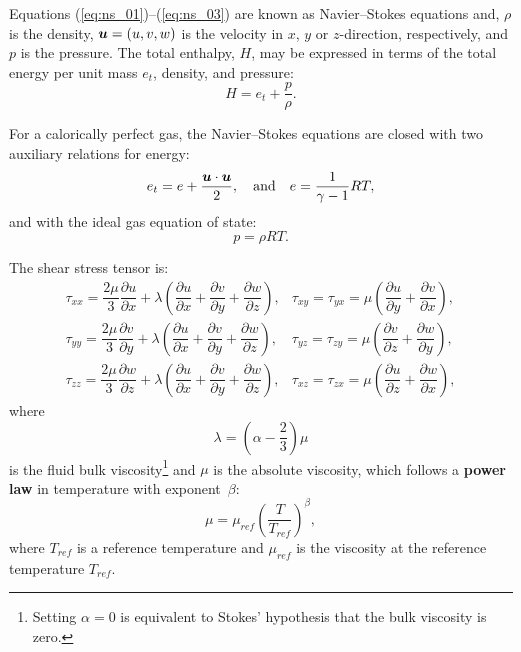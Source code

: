 \documentclass[10pt]{article}
\newcommand{\diff}[2] {\dfrac{\partial #1}{\partial #2}}
\newcommand{\bv}[1]{\ensuremath{\mbox{\boldmath$ #1 $}}}
\begin{document}
Equations (\ref{eq:ns_01})--(\ref{eq:ns_03}) are known as Navier--Stokes equations and, $\rho$ is the density, $\bv{u}=(u,v,w)$ is the velocity in $x$, $y$ or $z$-direction, respectively,    and $p$ is the pressure. The total enthalpy, $H$, may be expressed in terms of the total energy per unit mass $e_t$, density, and pressure:
$$H = e_t + \dfrac{p}{\rho}.$$ 

For a calorically perfect gas, the Navier--Stokes equations are closed with two auxiliary relations for energy:
\begin{equation}
 \label{eq:ns_04}
e_t= e+\dfrac{\bv{u}\cdot \bv{u}}{2},\quad\mbox{and}\quad e=\dfrac{1}{\gamma -1}RT ,
\end{equation}
and with the ideal gas equation of state:
\begin{equation}
 \label{eq:ns_05}
p=\rho RT.
\end{equation}

The shear stress tensor is:
\begin{equation*}
 \begin{array}{lll}
  \tau_{xx}= \dfrac{2\mu}{3}    \diff{u}{x} + \lambda \left(  \diff{u}{x}+ \diff{v}{y} +\diff{w}{z} \right),
  &\tau_{xy}= \tau_{yx}=\mu \left( \diff{u}{y} + \diff{v}{x}\right),\\
  \tau_{yy}= \dfrac{2\mu }{3}  \diff{v}{y} + \lambda \left(  \diff{u}{x}+ \diff{v}{y} +\diff{w}{z} \right),
  &\tau_{yz}= \tau_{zy}=\mu \left( \diff{v}{z} + \diff{w}{y}\right),\\
  \tau_{zz}= \dfrac{2 \mu}{3}  \diff{w}{z} + \lambda \left(  \diff{u}{x}+ \diff{v}{y} +\diff{w}{z} \right),
  &\tau_{xz}= \tau_{zx}=\mu \left( \diff{u}{z} + \diff{w}{x}\right),
 \end{array}
\end{equation*}
where 
\begin{equation}\label{eq:lambda}
\lambda=\left( \alpha -\dfrac{2}{3} \right)\mu   
\end{equation}
%
is the fluid bulk viscosity\footnote{Setting $\alpha=0$ is equivalent to Stokes' hypothesis that the bulk  viscosity is zero.}
and $\mu$ is the absolute viscosity, which follows a \textbf{power law} in temperature with exponent~$\beta$:
\begin{equation}
 \label{eq:PowerLaw01}
\mu=\mu_{ref}\left(\dfrac{T}{T_{ref}}\right)^\beta,
\end{equation}
where $T_{ref}$ is a reference temperature  and $\mu_{ref}$ is the viscosity at the reference temperature $T_{ref}$.
\end{document}
